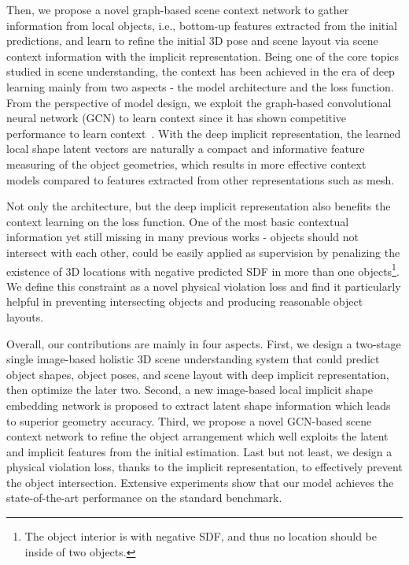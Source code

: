 \documentclass[final]{cvpr}
\begin{document}
Then, we propose a novel graph-based scene context network to gather information from local objects, i.e., bottom-up features extracted from the initial predictions, and learn to refine the initial 3D pose and scene layout via scene context information with the implicit representation.
Being one of the core topics studied in scene understanding, the context has been achieved in the era of deep learning mainly from two aspects - the model architecture and the loss function.
From the perspective of model design, we exploit the graph-based convolutional neural network (GCN) to learn context since it has shown competitive performance to learn context~\cite{yang2018graph}. With the deep implicit representation, the learned local shape latent vectors are naturally a compact and informative feature measuring of the object geometries, which results in more effective context models compared to features extracted from other representations such as mesh.


Not only the architecture, but the deep implicit representation also benefits the context learning on the loss function.
One of the most basic contextual information yet still missing in many previous works - objects should not intersect with each other, could be easily applied as supervision by penalizing the existence of 3D locations with negative predicted SDF in more than one objects\footnote{The object interior is with negative SDF, and thus no location should be inside of two objects.}.
We define this constraint as {a novel physical violation loss} and find it particularly helpful in preventing intersecting objects and producing reasonable object layouts.







Overall, our contributions are mainly in four aspects.
First, we design a two-stage single image-based holistic 3D scene understanding system that could predict object shapes, object poses, and scene layout with deep implicit representation, then optimize the later two.
Second, a new image-based local implicit shape embedding network is proposed to extract latent shape information which leads to superior geometry accuracy.
Third, we propose a novel GCN-based scene context network to refine the object arrangement which well exploits the latent and implicit features from the initial estimation. 
Last but not least, we design a physical violation loss, thanks to the implicit representation, to effectively prevent the object intersection.
Extensive experiments show that our model achieves the state-of-the-art performance on the standard benchmark.
\end{document}
